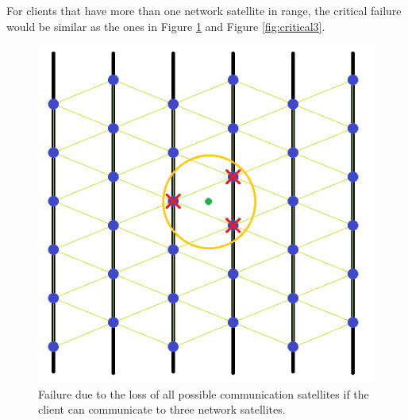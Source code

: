 For clients that have more than one network satellite in range, the critical failure would be similar as the ones in Figure \ref{fig:critical2} and Figure \ref{fig:critical3}. 

\begin{figure}[H]
\begin{center}
\includegraphics[scale=0.5]{critical2.PNG}
\caption[3 communication range failure]{Failure due to the loss of all possible communication satellites if the client can communicate to three network satellites.}
\label{fig:critical2}
\end{center}
\end{figure}


